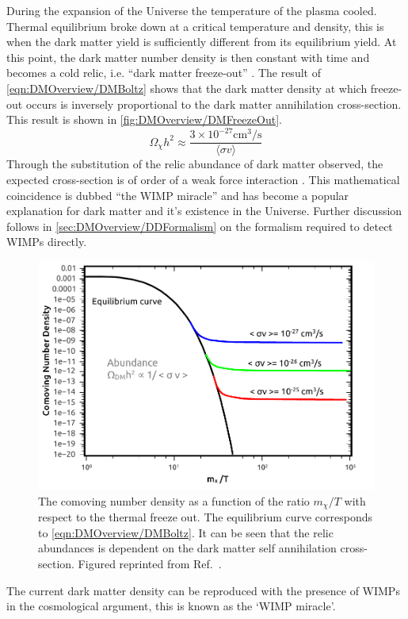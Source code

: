 During the expansion of the Universe the temperature of the plasma cooled. Thermal equilibrium broke down at a critical temperature and density, this is when the dark matter yield is sufficiently different from its equilibrium yield. At this point, the dark matter number density is then constant with time and becomes a cold relic, i.e. ``dark matter freeze-out'' \cite{DMPrimer}. The result of \autoref{eqn:DMOverview/DMBoltz} shows that the dark matter density at which freeze-out occurs is inversely proportional to the dark matter annihilation cross-section. This result is shown in \autoref{fig:DMOverview/DMFreezeOut}. 
\begin{equation}
    \Omega_\chi h^2\approx\frac{3\times10^{-27}\text{cm}^3/\text{s}}{\langle\sigma v\rangle}
\end{equation}
Through the substitution of the relic abundance of dark matter observed, the expected cross-section is of order of a weak force interaction \cite{Arcadi:2017kky}. This mathematical coincidence is dubbed ``the WIMP miracle'' and has become a popular explanation for dark matter and it's existence in the Universe. Further discussion follows in \autoref{sec:DMOverview/DDFormalism} on the formalism required to detect WIMPs directly. %
\begin{figure}[h!]
    \centering
    \includegraphics[width=0.7\linewidth]{figures/DMOverview/abundanceplot.pdf}
    \caption{The comoving number density as a function of the ratio $m_\chi/T$ with respect to the thermal freeze out. The equilibrium curve corresponds to \autoref{eqn:DMOverview/DMBoltz}. It can be seen that the relic abundances is dependent on the dark matter self annihilation cross-section. Figured reprinted from Ref.~\cite{Arcadi:2017kky}.}
    \label{fig:DMOverview/DMFreezeOut}
\end{figure}
\iffalse
The current dark matter density can be reproduced with the presence of WIMPs in the cosmological argument, this is known as the `WIMP miracle'\cite{DMPrimer}. 
